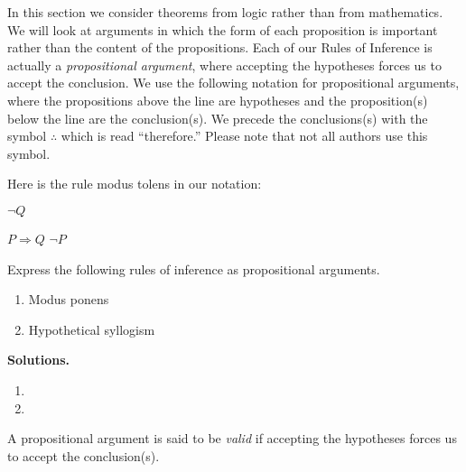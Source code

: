 In this section we consider theorems from logic rather than from mathematics. We will look at arguments in which the form of each proposition is important rather than the content of the propositions.  Each of our Rules of Inference is actually a \emph{propositional argument}, where accepting the hypotheses forces us to accept the conclusion. We use the following notation for propositional arguments, where the propositions above the line are hypotheses and the proposition(s) below the line are the conclusion(s). We precede the conclusions(s) with the symbol $\therefore$ which is read ``therefore.'' Please note that not all authors use this symbol. 

\begin{example}
Here is the rule modus tolens in our notation:
\begin{centeredarg}
\item $\neg Q$
\item $P\Rightarrow Q$
\hence $\neg P$
\end{centeredarg}
\end{example}

\begin{example}\label{ex:inference}
Express the following rules of inference as propositional arguments.
\begin{enumerate}\itemsep0pt
\item Modus ponens
\item Hypothetical syllogism
\end{enumerate}
{\bfseries\upshape Solutions.}
\begin{enumerate}
\item {}
\item {}
\end{enumerate}
\end{example}

\begin{definition}
A propositional argument is said to be \emph{valid} if accepting the hypotheses forces us to accept the conclusion(s).
\end{definition}

